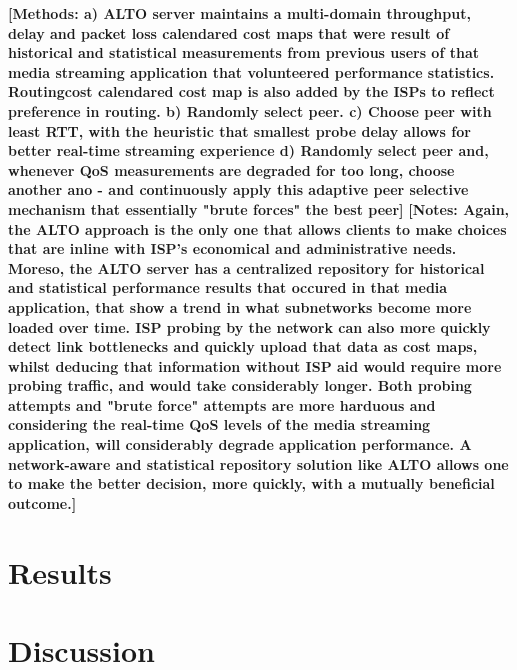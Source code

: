 \textbf{[Methods: a) ALTO server maintains a multi-domain throughput, delay and packet loss calendared cost maps that were result of historical and statistical measurements from previous users of that media streaming application that volunteered performance statistics. Routingcost calendared cost map is also added by the ISPs to reflect preference in routing. b) Randomly select peer. c) Choose peer with least RTT, with the heuristic that smallest probe delay allows for better real-time streaming experience d) Randomly select peer and, whenever QoS measurements are degraded for too long, choose another ano - and continuously apply this adaptive peer selective mechanism that essentially "brute forces" the best peer]}
\textbf{[Notes: Again, the ALTO approach is the only one that allows clients to make choices that are inline with ISP's economical and administrative needs. Moreso, the ALTO server has a centralized repository for historical and statistical performance results that occured in that media application, that show a trend in what subnetworks become more loaded over time. ISP probing by the network can also more quickly detect link bottlenecks and quickly upload that data as cost maps, whilst deducing that information without ISP aid would require more probing traffic, and would take considerably longer. Both probing attempts and "brute force" attempts are more harduous and considering the real-time QoS levels of the media streaming application, will considerably degrade application performance. A network-aware and statistical repository solution like ALTO allows one to make the better decision, more quickly, with a mutually beneficial outcome.]}

\section{Results}
\section{Discussion}


